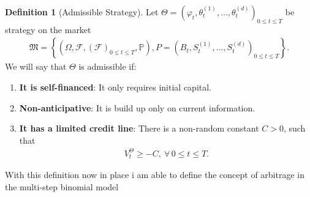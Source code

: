 \documentclass{article}
\theoremstyle{definition}
\newtheorem{definition}[theorem]{Definition}
\numberwithin{equation}{section}
\begin{document}
\begin{definition}[Admissible Strategy]
    Let $\Theta = \left(\varphi_t, \theta_t^{(1)}, \ldots, \theta_t^{(d)}\right)_{0 \leq t \leq T}$ be strategy on the market
    \begin{align}
        \mathfrak{M} =
        \left\{
            \left(
                \Omega, 
                \mathscr{F}, 
                \left(
                    \mathscr{F}
                \right)_{0 \leq t \leq T},
                \mathbb{P}
            \right),
            P =
            \left(
                B_t,
                S_t^{(1)},
                \ldots,
                S_t^{(d)}
            \right)_{0 \leq t \leq T}
        \right\}.
    \end{align}
    We will say that $\Theta$ is admissible if:
    \begin{enumerate}
        \item \textbf{It is self-financed}: It only requires initial capital.
        \item \textbf{Non-anticipative}: It is build up only on current information.
        \item \textbf{It has a limited credit line}: There is a non-random constant $C > 0$, such that
        \begin{align}
            V_t^{\Theta} \geq -C, \ \forall \, 0 \leq t \leq T.
        \end{align}
    \end{enumerate}
\end{definition}
With this definition now in place i am able to define the concept of arbitrage in the multi-step binomial model
\end{document}
